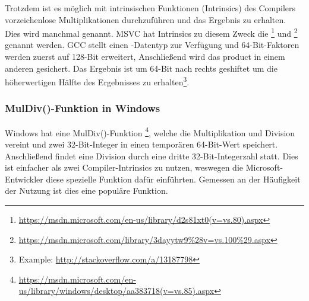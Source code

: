 Trotzdem ist es möglich mit intrinsischen Funktionen (Intrinsics) des Compilers vorzeichenlose Multiplikationen durchzuführen
und das  Ergebnis zu erhalten.
Dies wird manchmal  genannt.
MSVC hat Intrinsics zu diesem Zweck die \footnote{\url{https://msdn.microsoft.com/en-us/library/d2s81xt0(v=vs.80).aspx}}
und \footnote{\url{https://msdn.microsoft.com/library/3dayytw9%28v=vs.100%29.aspx}} genannt werden.
GCC stellt einen -Datentyp zur Verfügung und 64-Bit-Faktoren werden zuerst auf 128-Bit erweitert,
Anschließend wird das \gls{product} in einem anderen  gesichert.
Das Ergebnis ist um 64-Bit nach rechts geshiftet um die höherwertigen Hälfte des Ergebnisses
zu erhalten\footnote{Example: \url{http://stackoverflow.com/a/13187798}}.

\subsubsection{MulDiv()-Funktion in Windows}

Windows hat eine MulDiv()-Funktion
\footnote{\url{https://msdn.microsoft.com/en-us/library/windows/desktop/aa383718(v=vs.85).aspx}},
welche die Multiplikation und Division vereint und zwei 32-Bit-Integer in einen temporären 64-Bit-Wert
speichert. Anschließend findet eine Division durch eine dritte 32-Bit-Integerzahl statt.
Dies ist einfacher als zwei Compiler-Intrinsics zu nutzen, weswegen die Microsoft-Entwickler diese
spezielle Funktion dafür einführten.
Gemessen an der Häufigkeit der Nutzung ist dies eine populäre Funktion.
